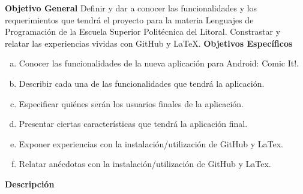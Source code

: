 \documentclass[12pt]{report}
\begin{document}
	\begingroup
		\large{
			\textbf{
				Objetivo General
				\newline
				\newline
			}
		}
	\endgroup
	Definir y dar a conocer las funcionalidades y los requerimientos que tendrá el proyecto para la materia Lenguajes de Programación de la Escuela Superior Politécnica del Litoral. 
\newline
\newline
Constrastar y relatar las experiencias vividas con GitHub y LaTeX.
	\vspace{4em}
	\newline
	\begingroup
		\large{
			\textbf{
				Objetivos Específicos
				\newline
			}
		}
	\endgroup
		\begin{enumerate}[(a)]%
		\item Conocer las funcionalidades de la nueva aplicación para Android: Comic It!.
		\item Describir cada una de las funcionalidades que tendrá la aplicación.
		\item Especificar quiénes serán los usuarios finales de la aplicación.
		\item Presentar ciertas características que tendrá la aplicación final.
		\item Exponer experiencias con la instalación/utilización de GitHub y LaTex.
		\item Relatar anécdotas con la instalación/utilización de GitHub y LaTex.
		\end{enumerate}
	
	
\newpage
	\begingroup
		\large{
			\textbf{
				Descripción
				\newline
				\newline
			}
		}
	\endgroup
\end{document}
